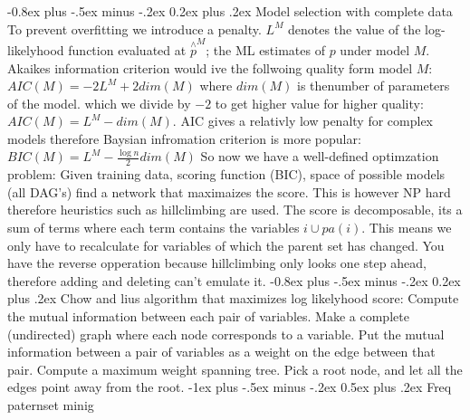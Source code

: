 \documentclass[8pt,landscape]{extarticle}
\makeatletter
\renewcommand{\section}{\@startsection{section}{1}{0mm}%
                                {-1ex plus -.5ex minus -.2ex}%
                                {0.5ex plus .2ex}%
                                {\normalfont\large\bfseries}}
\renewcommand{\subsection}{\@startsection{subsection}{2}{0mm}%
                                {-0.8ex plus -.5ex minus -.2ex}%
                                {0.2ex plus .2ex}%
                                {\normalfont\normalsize\bfseries}}
\makeatother
\begin{document}
\begin{multicols}{3}
\subsection{Model selection with complete data}
To prevent overfitting we introduce a penalty. $L^M$ denotes the value of the
log-likelyhood function evaluated at $\overset{\wedge}{p}^M$; the ML estimates
of $p$ under model $M$. Akaikes information criterion would ive the follwoing
quality form model $M$: $AIC(M)=-2L^M+2dim(M)$ where $dim(M)$ is thenumber of
parameters of the model. which we divide by $-2$ to get higher value for higher
quality: $AIC(M)=L^M-dim(M)$. AIC gives a relativly low penalty for complex
models therefore Baysian infromation criterion is more popular:
$BIC(M)=L^M-\frac{\log n}{2} dim(M)$
So now we have a well-defined optimzation problem: Given training data, scoring
function (BIC), space of possible models (all DAG's) find a network that
maximaizes the score.
This is however NP hard therefore heuristics such as hillclimbing are used.
The score is decomposable, its a sum of terms where each term contains the
variables $i \cup pa(i)$. This means we only have to recalculate for variables
of which the parent set has changed.
You have the reverse opperation because hillclimbing only looks one step ahead,
therefore adding and deleting can't emulate it.
\subsection{Chow and lius algorithm}
that maximizes log likelyhood score:
Compute the mutual information between each pair of variables.
Make a complete (undirected) graph where each node corresponds to a variable.
Put the mutual information between a pair of variables as a weight on the edge
between that pair. Compute a maximum weight spanning tree.
Pick a root node, and let all the edges point away from the root.
\section{Freq paternset minig}

\end{multicols}
\end{document}
